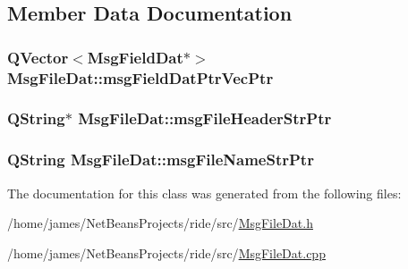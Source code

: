 \subsection{Member Data Documentation}
\hypertarget{class_msg_file_dat_aa40638f3cc6eaee686c0f5f729349ae5}{
\subsubsection[{msg\-Field\-Dat\-Ptr\-Vec\-Ptr}]{\setlength{\rightskip}{0pt plus 5cm}Q\-Vector$<${\bf Msg\-Field\-Dat}$\ast$$>$ Msg\-File\-Dat\-::msg\-Field\-Dat\-Ptr\-Vec\-Ptr\hspace{0.3cm}{\ttfamily [private]}}}\label{class_msg_file_dat_aa40638f3cc6eaee686c0f5f729349ae5}
\hypertarget{class_msg_file_dat_aadbf86f44cd8bd440bd6ecbff36c540d}{
\subsubsection[{msg\-File\-Header\-Str\-Ptr}]{\setlength{\rightskip}{0pt plus 5cm}Q\-String$\ast$ Msg\-File\-Dat\-::msg\-File\-Header\-Str\-Ptr\hspace{0.3cm}{\ttfamily [private]}}}\label{class_msg_file_dat_aadbf86f44cd8bd440bd6ecbff36c540d}
\hypertarget{class_msg_file_dat_a6fe034583c677bc9a21b96061fe80898}{
\subsubsection[{msg\-File\-Name\-Str\-Ptr}]{\setlength{\rightskip}{0pt plus 5cm}Q\-String Msg\-File\-Dat\-::msg\-File\-Name\-Str\-Ptr\hspace{0.3cm}{\ttfamily [private]}}}\label{class_msg_file_dat_a6fe034583c677bc9a21b96061fe80898}


The documentation for this class was generated from the following files\-:\begin{DoxyCompactItemize}
\item 
/home/james/\-Net\-Beans\-Projects/ride/src/\hyperlink{_msg_file_dat_8h}{Msg\-File\-Dat.\-h}\item 
/home/james/\-Net\-Beans\-Projects/ride/src/\hyperlink{_msg_file_dat_8cpp}{Msg\-File\-Dat.\-cpp}\end{DoxyCompactItemize}
